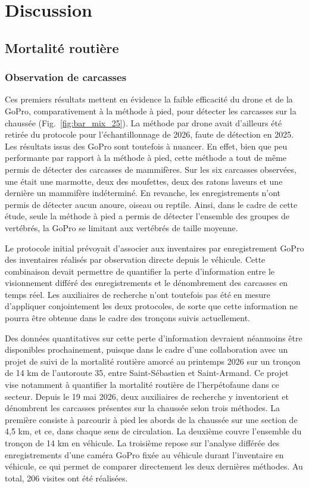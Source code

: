 \section{Discussion}

\subsection{Mortalité routière}

\subsubsection{Observation de carcasses}

Ces premiers résultats mettent en évidence la faible efficacité du drone et de la GoPro, comparativement à la méthode à pied, pour détecter les carcasses sur la chaussée (Fig.~\ref{fig:bar_mix_25}). La méthode par drone avait d'ailleurs été retirée du protocole pour l'échantillonnage de 2026, faute de détection en 2025. Les résultats issus des GoPro sont toutefois à nuancer. En effet, bien que peu performante par rapport à la méthode à pied, cette méthode a tout de même permis de détecter des carcasses de mammifères. Sur les six carcasses observées, une était une marmotte, deux des moufettes, deux des ratons laveurs et une dernière un mammifère indéterminé. En revanche, les enregistrements n'ont permis de détecter aucun anoure, oiseau ou reptile. Ainsi, dans le cadre de cette étude, seule la méthode à pied a permis de détecter l'ensemble des groupes de vertébrés, la GoPro se limitant aux vertébrés de taille moyenne.

Le protocole initial prévoyait d'associer aux inventaires par enregistrement GoPro des inventaires réalisés par observation directe depuis le véhicule. Cette combinaison devait permettre de quantifier la perte d'information entre le visionnement différé des enregistrements et le dénombrement des carcasses en temps réel. Les auxiliaires de recherche n'ont toutefois pas été en mesure d'appliquer conjointement les deux protocoles, de sorte que cette information ne pourra être obtenue dans le cadre des tronçons suivis actuellement. 

Des données quantitatives sur cette perte d'information devraient néanmoins être disponibles prochainement, puisque dans le cadre d'une collaboration avec un projet de suivi de la mortalité routière amorcé au printemps 2026 sur un tronçon de 14 km de l'autoroute 35, entre Saint-Sébastien et Saint-Armand. Ce projet vise notamment à quantifier la mortalité routière de l'herpétofaune dans ce secteur. Depuis le 19 mai 2026, deux auxiliaires de recherche y inventorient et dénombrent les carcasses présentes sur la chaussée selon trois méthodes. La première consiste à parcourir à pied les abords de la chaussée sur une section de 4,5 km, et ce, dans chaque sens de circulation. La deuxième couvre l'ensemble du tronçon de 14 km en véhicule. La troisième repose sur l'analyse différée des enregistrements d'une caméra GoPro fixée au véhicule durant l'inventaire en véhicule, ce qui permet de comparer directement les deux dernières méthodes. Au total, 206 visites ont été réalisées.

